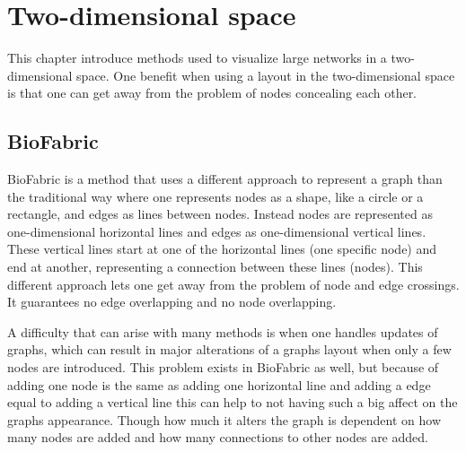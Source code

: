 \documentclass[a4paper,11pt]{kth-mag}
\begin{document}
\section{Two-dimensional space}
This chapter introduce methods used to visualize large networks in a two-dimensional space. One benefit when using a layout in 
the two-dimensional space is that one can get away from the problem of nodes concealing each other. 
\subsection{BioFabric}
BioFabric\cite{23102059} is a method that uses a different approach to represent a graph than the traditional way where one represents nodes
as a shape, like a circle or a rectangle, and edges as lines between nodes. Instead nodes are represented as one-dimensional
horizontal lines and edges as one-dimensional vertical lines. These vertical lines start at one of the horizontal lines (one specific node)
and end at another, representing a connection between these lines (nodes). This different approach lets one get away from the problem of node and edge crossings.
It guarantees no edge overlapping and no node overlapping.

A difficulty that can arise with many methods is when one handles updates of graphs, which can result in major alterations of a graphs layout when only a few nodes are introduced. 
This problem exists in BioFabric as well, but because of adding one node is the same as adding one horizontal line and adding a edge equal to adding a vertical line this can 
help to not having such a big affect on the graphs appearance. Though how much it alters the graph is dependent on how many nodes are added and how many connections to other nodes are
added.
\end{document}
